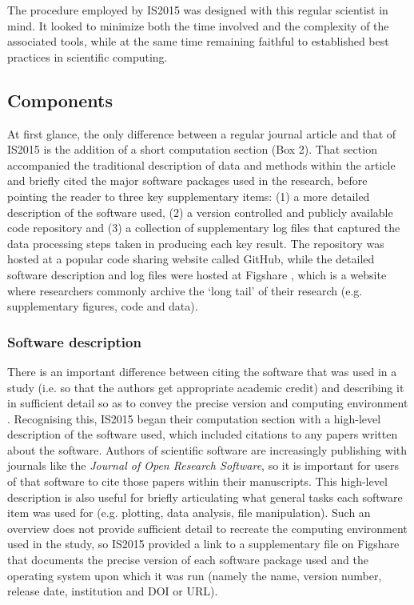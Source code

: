 The procedure employed by IS2015 was designed with this regular scientist in mind. It looked to minimize both the time involved and the complexity of the associated tools, while at the same time remaining faithful to established best practices in scientific computing.
  
\subsection{Components}

At first glance, the only difference between a regular journal article and that of IS2015 is the addition of a short computation section (Box 2). That section accompanied the traditional description of data and methods within the article and briefly cited the major software packages used in the research, before pointing the reader to three key supplementary items: (1) a more detailed description of the software used, (2) a version controlled and publicly available code repository and (3) a collection of supplementary log files that captured the data processing steps taken in producing each key result. The repository was hosted at a popular code sharing website called GitHub, while the detailed software description and log files were hosted at Figshare \citep{Irving2015}, which is a website where researchers commonly archive the `long tail' of their research (e.g. supplementary figures, code and data). 

\subsubsection{Software description}

There is an important difference between citing the software that was used in a study (i.e. so that the authors get appropriate academic credit) and describing it in sufficient detail so as to convey the precise version and computing environment \citep{Jackson2012}. Recognising this, IS2015 began their computation section with a high-level description of the software used, which included citations to any papers written about the software. Authors of scientific software are increasingly publishing with journals like the \textit{Journal of Open Research Software}, so it is important for users of that software to cite those papers within their manuscripts. This high-level description is also useful for briefly articulating what general tasks each software item was used for (e.g. plotting, data analysis, file manipulation). Such an overview does not provide sufficient detail to recreate the computing environment used in the study, so IS2015 provided a link to a supplementary file on Figshare that documents the precise version of each software package used and the operating system upon which it was run (namely the name, version number, release date, institution and DOI or URL). 

